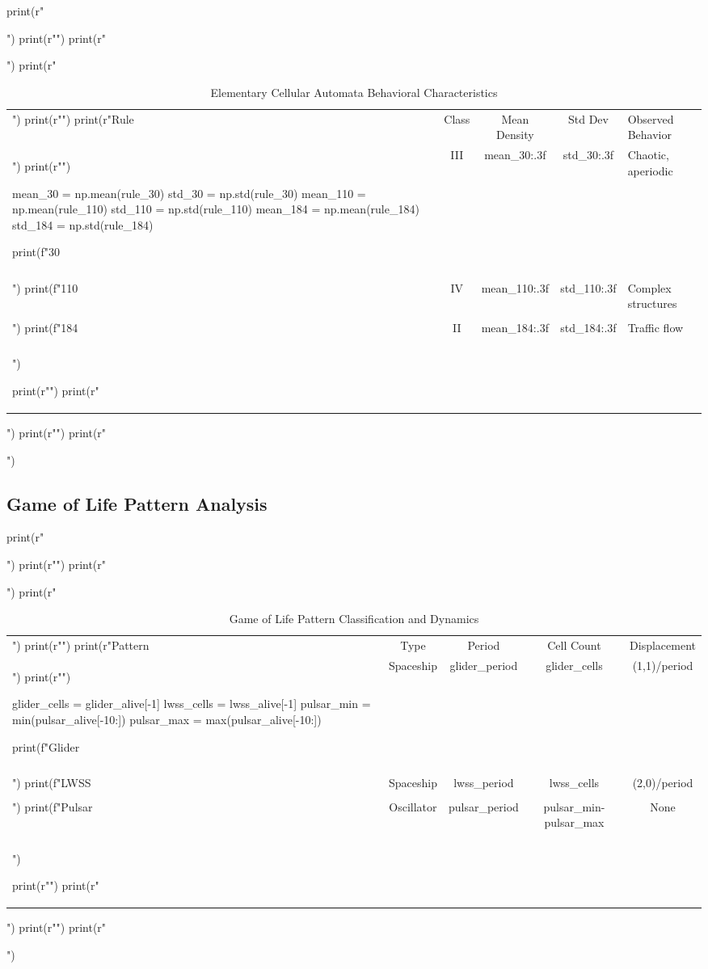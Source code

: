 \documentclass[a4paper, 11pt]{article}
\begin{document}
\begin{pycode}
print(r"\begin{table}[htbp]")
print(r"\centering")
print(r"\caption{Elementary Cellular Automata Behavioral Characteristics}")
print(r"\begin{tabular}{lcccl}")
print(r"\toprule")
print(r"Rule & Class & Mean Density & Std Dev & Observed Behavior \\")
print(r"\midrule")

mean_30 = np.mean(rule_30)
std_30 = np.std(rule_30)
mean_110 = np.mean(rule_110)
std_110 = np.std(rule_110)
mean_184 = np.mean(rule_184)
std_184 = np.std(rule_184)

print(f"30 & III & {mean_30:.3f} & {std_30:.3f} & Chaotic, aperiodic \\\\")
print(f"110 & IV & {mean_110:.3f} & {std_110:.3f} & Complex structures \\\\")
print(f"184 & II & {mean_184:.3f} & {std_184:.3f} & Traffic flow \\\\")

print(r"\bottomrule")
print(r"\end{tabular}")
print(r"\label{tab:elementary}")
print(r"\end{table}")
\end{pycode}

\subsection{Game of Life Pattern Analysis}

\begin{pycode}
print(r"\begin{table}[htbp]")
print(r"\centering")
print(r"\caption{Game of Life Pattern Classification and Dynamics}")
print(r"\begin{tabular}{lcccc}")
print(r"\toprule")
print(r"Pattern & Type & Period & Cell Count & Displacement \\")
print(r"\midrule")

glider_cells = glider_alive[-1]
lwss_cells = lwss_alive[-1]
pulsar_min = min(pulsar_alive[-10:])
pulsar_max = max(pulsar_alive[-10:])

print(f"Glider & Spaceship & {glider_period} & {glider_cells} & (1,1)/period \\\\")
print(f"LWSS & Spaceship & {lwss_period} & {lwss_cells} & (2,0)/period \\\\")
print(f"Pulsar & Oscillator & {pulsar_period} & {pulsar_min}-{pulsar_max} & None \\\\")

print(r"\bottomrule")
print(r"\end{tabular}")
print(r"\label{tab:gameoflife}")
print(r"\end{table}")
\end{pycode}
\end{document}

